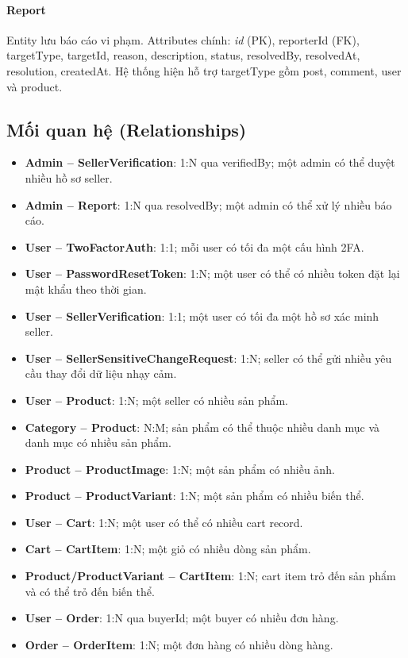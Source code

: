 \paragraph{Report} Entity lưu báo cáo vi phạm. Attributes chính: \textit{id} (PK), reporterId (FK), targetType, targetId, reason, description, status, resolvedBy, resolvedAt, resolution, createdAt. Hệ thống hiện hỗ trợ targetType gồm post, comment, user và product.

\subsection{Mối quan hệ (Relationships)}
\begin{itemize}
  \item \textbf{Admin -- SellerVerification}: 1:N qua verifiedBy; một admin có thể duyệt nhiều hồ sơ seller.
  \item \textbf{Admin -- Report}: 1:N qua resolvedBy; một admin có thể xử lý nhiều báo cáo.
  \item \textbf{User -- TwoFactorAuth}: 1:1; mỗi user có tối đa một cấu hình 2FA.
  \item \textbf{User -- PasswordResetToken}: 1:N; một user có thể có nhiều token đặt lại mật khẩu theo thời gian.
  \item \textbf{User -- SellerVerification}: 1:1; một user có tối đa một hồ sơ xác minh seller.
  \item \textbf{User -- SellerSensitiveChangeRequest}: 1:N; seller có thể gửi nhiều yêu cầu thay đổi dữ liệu nhạy cảm.
  \item \textbf{User -- Product}: 1:N; một seller có nhiều sản phẩm.
  \item \textbf{Category -- Product}: N:M; sản phẩm có thể thuộc nhiều danh mục và danh mục có nhiều sản phẩm.
  \item \textbf{Product -- ProductImage}: 1:N; một sản phẩm có nhiều ảnh.
  \item \textbf{Product -- ProductVariant}: 1:N; một sản phẩm có nhiều biến thể.
  \item \textbf{User -- Cart}: 1:N; một user có thể có nhiều cart record.
  \item \textbf{Cart -- CartItem}: 1:N; một giỏ có nhiều dòng sản phẩm.
  \item \textbf{Product/ProductVariant -- CartItem}: 1:N; cart item trỏ đến sản phẩm và có thể trỏ đến biến thể.
  \item \textbf{User -- Order}: 1:N qua buyerId; một buyer có nhiều đơn hàng.
  \item \textbf{Order -- OrderItem}: 1:N; một đơn hàng có nhiều dòng hàng.

\end{itemize}
